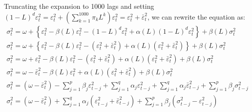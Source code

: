 Truncating the expansion to 1000 lags and setting ${\left( {1 - L} \right)^d}\varepsilon _t^2 = \varepsilon _t^2 + \left( {\sum\limits_{k = 1}^{1000} {{\pi _k}{L^k}} } \right)\varepsilon _t^2 = \varepsilon _t^2 + \bar \varepsilon _t^2$, we can rewrite the equation as:
\begin{equation}
\begin{array}{l}
\sigma _t^2 = \omega  + \left\{ {\varepsilon _t^2 - \beta \left( L \right)\varepsilon _t^2 - {{\left( {1 - L} \right)}^d}\varepsilon _t^2 + \alpha \left( L \right){{\left( {1 - L} \right)}^d}\varepsilon _t^2} \right\} + \beta \left( L \right)\sigma _t^2\\
\sigma _t^2 = \omega  + \left\{ {\varepsilon _t^2 - \beta \left( L \right)\varepsilon _t^2 - \left( {\varepsilon _t^2 + \bar \varepsilon _t^2} \right) + \alpha \left( L \right)\left( {\varepsilon _t^2 + \bar \varepsilon _t^2} \right)} \right\} + \beta \left( L \right)\sigma _t^2\\
\sigma _t^2 = \omega  + \varepsilon _t^2 - \beta \left( L \right)\varepsilon _t^2 - \left( {\varepsilon _t^2 + \bar \varepsilon _t^2} \right) + \alpha \left( L \right)\left( {\varepsilon _t^2 + \bar \varepsilon _t^2} \right) + \beta \left( L \right)\sigma _t^2\\
\sigma _t^2 = \omega  - \bar \varepsilon _t^2 - \beta \left( L \right)\varepsilon _t^2 + \alpha \left( L \right)\left( {\varepsilon _t^2 + \bar \varepsilon _t^2} \right) + \beta \left( L \right)\sigma _t^2\\
\sigma _t^2 = \left( {\omega  - \bar \varepsilon _t^2} \right) - \sum\limits_{j = 1}^p {{\beta _j}\varepsilon _{t - j}^2 + \sum\limits_{j = 1}^q {{\alpha _j}\varepsilon _{t - j}^2}  + } \sum\limits_{j = 1}^q {{\alpha _j}\bar \varepsilon _{t - j}^2}  + \sum\limits_{j = 1}^p {{\beta _j}\sigma _{t - j}^2} \\
\sigma _t^2 = \left( {\omega  - \bar \varepsilon _t^2} \right) + \sum\limits_{j = 1}^q {{\alpha _j}\left( {\varepsilon _{t - j}^2 + \bar \varepsilon _{t - j}^2} \right)}  + \sum\limits_{j = 1}^p {{\beta _j}\left( {\sigma _{t - j}^2 - \varepsilon _{t - j}^2} \right)} 
\end{array}
\end{equation}

